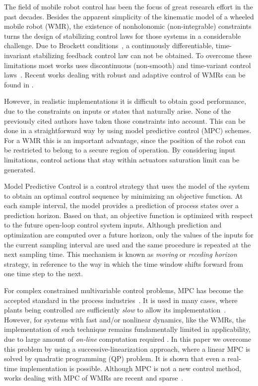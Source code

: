 \documentclass[conference]{IEEEtran} %
\begin{document}
The field of mobile robot control has been the focus of great research effort in the past decades. Besides the apparent simplicity of the kinematic model of a wheeled mobile robot (WMR), the existence of nonholonomic (non-integrable) constraints turns the design of stabilizing control laws for those systems in a considerable challenge. Due to Brockett
conditions~\cite{brockett82}, a continuously differentiable, time-invariant stabilizing feedback control law can not be obtained. To overcome these limitations most works uses discontinuous (non-smooth) and time-variant control laws~\cite{bloch89,samson91,canudas92,yamamoto94,murray97}. Recent works dealing with robust and adaptive control of WMRs can be found in \cite{oya03,dixon04}.

However, in realistic implementations it is difficult to obtain good performance, due to the constraints on inputs or states that naturally arise. None of the previously cited authors have taken those constraints into account. This can be done in a straightforward way by using model predictive control (MPC) schemes. For a WMR this is an important advantage,
since the position of the robot can be restricted to belong to a secure region of operation. By considering input limitations, control actions that stay within actuators saturation limit can be generated.

Model Predictive Control is a control strategy that uses the model of the system to obtain an optimal control sequence by minimizing an objective function. At each sample interval, the model provides a prediction of process states over a prediction horizon. Based on that, an objective function is optimized with respect to the future open-loop control system
inputs. Although prediction and optimization are computed over a future horizon, only the values of the inputs for the current sampling interval are used and the same procedure is repeated at the next sampling time. This mechanism is known as {\it moving} or {\it receding horizon} strategy, in reference to the way in which the time window shifts forward from one time step to the next.

For complex constrained multivariable control problems, MPC has become the accepted standard in the process industries~\cite{bemporad02}. It is used in many cases, where plants being controlled are sufficiently {\em slow} to allow its implementation~\cite{mayne98}. However, for systems with fast and/or nonlinear dynamics, like the WMRs, the implementation of such technique remains fundamentally limited in applicability, due to large amount of {\em on-line} computation required \cite{cannon00}. In this paper we overcome this problem by using a successive-linearization approach, where a linear MPC is solved by quadratic programming (QP) problem. It is shown that even a real-time implementation is possible. Although MPC is not a new control method, works dealing with MPC of WMRs are recent and sparse~\cite{ollero91,rico99,essen01}.
\end{document}
